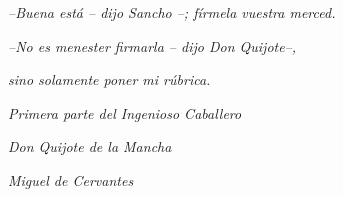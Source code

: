 \vfill%

\hfill \emph{--Buena está -- dijo Sancho --; fírmela vuestra merced.}

\hfill \emph{--No es menester firmarla -- dijo Don Quijote--,}

\hfill \emph{sino solamente poner mi rúbrica.}

\hfill

\hfill \emph{Primera parte del Ingenioso Caballero}

\hfill \emph{Don Quijote de la Mancha}

\hfill \emph{Miguel de Cervantes}


\newpage
\thispagestyle{empty}\mbox{}

\newpage


